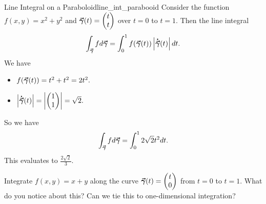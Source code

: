                        \begin{ex}{Line Integral on a Paraboloid}{line_int_parabooid}
                       Consider the function $f(x,y)=x^2+y^2$ and $\boldsymbol{\vec{\gamma}}(t)=\begin{pmatrix} t \\ t \end{pmatrix}$ over $t=0$ to $t=1$.  Then the line integral
                       \[
                       \int_{\boldsymbol{\vec{\gamma}}} fd\boldsymbol{\vec{\gamma}} = \int_0^1 f(\boldsymbol{\vec{\gamma}}(t))\left|\boldsymbol{\dot{\vec{\gamma}}}(t)\right|dt.
                       \]
                       We have
                       \begin{itemize}
                           \item $f(\boldsymbol{\vec{\gamma}}(t))=t^2+t^2=2t^2.$
                           \item $\left|\boldsymbol{\dot{\vec{\gamma}}}(t)\right|=\left|\begin{pmatrix} 1 \\ 1\end{pmatrix}\right|=\sqrt{2}.$
                       \end{itemize}
                       So we have
                       \[
                       \int_{\boldsymbol{\vec{\gamma}}} fd\boldsymbol{\vec{\gamma}} = \int_0^1 2\sqrt{2}t^2dt.
                       \]
                       This evaluates to $\frac{2\sqrt{2}}{3}$.
                       \end{ex}
                       
                       \begin{exercise}
                       Integrate $f(x,y)=x+y$ along the curve $\boldsymbol{\vec{\gamma}}(t)=\begin{pmatrix} t \\ 0 \end{pmatrix}$ from $t=0$ to $t=1$. What do you notice about this? Can we tie this to one-dimensional integration?
                       \end{exercise}
                       
                                	        
                   	
